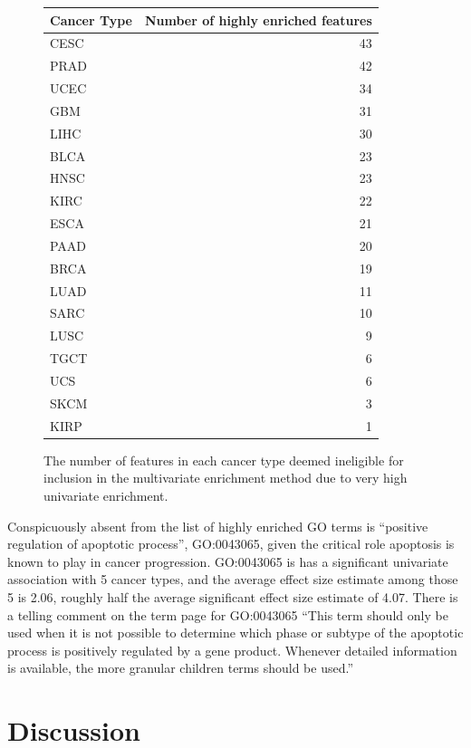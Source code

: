 \begin{figure}
    \centering
\begin{tabular}{l|r}
  \hline
  Cancer Type & Number of highly enriched features\\
  \hline
  CESC & 43\\
  \hline
  PRAD & 42\\
  \hline
  UCEC & 34\\
  \hline
  GBM & 31\\
  \hline
  LIHC & 30\\
  \hline
  BLCA & 23\\
  \hline
  HNSC & 23\\
  \hline
  KIRC & 22\\
  \hline
  ESCA & 21\\
  \hline
  PAAD & 20\\
  \hline
  BRCA & 19\\
  \hline
  LUAD & 11\\
  \hline
  SARC & 10\\
  \hline
  LUSC & 9\\
  \hline
  TGCT & 6\\
  \hline
  UCS & 6\\
  \hline
  SKCM & 3\\
  \hline
  KIRP & 1\\
  \hline
\end{tabular}
    \label{fig:n_enriched}
    \caption{The number of features in each cancer type deemed ineligible for inclusion in the multivariate enrichment method due to very high univariate enrichment.}
\end{figure}


Conspicuously absent from the list of highly enriched GO terms is ``positive regulation of apoptotic process'', GO:0043065, given the critical role apoptosis is known to play in cancer progression. GO:0043065 is has a significant univariate association with 5 cancer types, and the average effect size estimate among those 5 is 2.06, roughly half the average significant effect size estimate of 4.07. There is a telling comment on the term page for GO:0043065 ``This term should only be used when it is not possible to determine which phase or subtype of the apoptotic process is positively regulated by a gene product. Whenever detailed information is available, the more granular children terms should be used.''

\section{Discussion}\label{sec:org3165b14}

